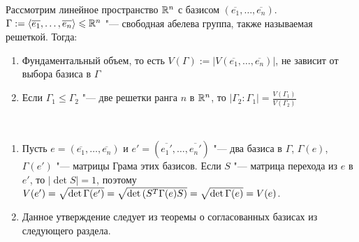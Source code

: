 \begin{exercise}
	Рассмотрим линейное пространство $\mathbb{R}^n$ с базисом $(\overline{e_1}, \dotsc, \overline{e_n})$. $\Gamma \hm:= \gl \overline{e_1}, \dotsc, \overline{e_n}\gr \le \R^n$ "--- свободная абелева группа, также называемая решеткой. Тогда:
	\begin{enumerate}
		\item Фундаментальный объем, то есть $V(\Gamma) := |V(\overline{e_1}, \dotsc, \overline{e_n})|$, не зависит от выбора базиса в $\Gamma$
		
		\item Если $\Gamma_1 \le \Gamma_2$ "--- две решетки ранга $n$ в $\mathbb{R}^n$, то $|\Gamma_2 : \Gamma_1| = \frac{V(\Gamma_1)}{V(\Gamma_2)}$
	\end{enumerate}
\end{exercise}

\begin{solution}~
	\begin{enumerate}
		\item Пусть $e = (\overline{e_1}, \dotsc, \overline{e_n})$ и $e' = (\overline{e_1'}, \dotsc, \overline{e_n'})$ "--- два базиса в $\Gamma$, $\Gamma(e)$, $\Gamma(e')$ "--- матрицы Грама этих базисов. Если $S$ "--- матрица перехода из $e$ в $e'$, то $|\det{S}| = 1$, поэтому $V(e') \hm= \sqrt{\det\Gamma(e')} \hm= \sqrt{\det{(S^T\Gamma(e)S)}} = \sqrt{\det\Gamma(e)} = V(e)$.
		
		\item Данное утверждение следует из теоремы о согласованных базисах из следующего раздела.
	\end{enumerate}
\end{solution}